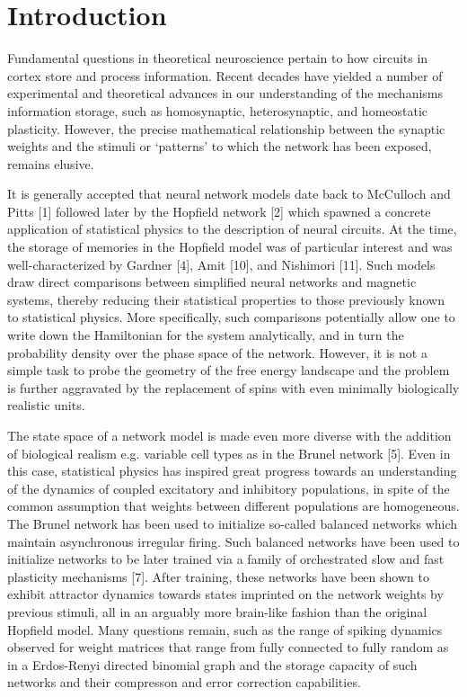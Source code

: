 \documentclass{ucetd}
\begin{document}
\mainmatter

\chapter{Introduction}

Fundamental questions in theoretical neuroscience pertain to how circuits in cortex store and process information. Recent decades have yielded a number of experimental and theoretical advances in our understanding of the mechanisms information storage, such as homosynaptic, heterosynaptic, and homeostatic plasticity. However, the precise mathematical relationship between the synaptic weights and the stimuli or `patterns' to which the network has been exposed, remains elusive. 

It is generally accepted that neural network models date back to McCulloch and Pitts [1] followed later by the Hopfield network [2] which spawned a concrete application of statistical physics to the description of neural circuits. At the time, the storage of memories in the Hopfield model was of particular interest and was well-characterized by Gardner [4], Amit [10], and Nishimori [11]. Such models draw direct comparisons between simplified neural networks and magnetic systems, thereby reducing their statistical properties to those previously known to statistical physics. More specifically, such comparisons potentially allow one to write down the Hamiltonian for the system analytically, and in turn the probability density over the phase space of the network. However, it is not a simple task to probe the geometry of the free energy landscape and the problem is further aggravated by the replacement of spins with even minimally biologically realistic units. 

The state space of a network model is made even more diverse with the addition of biological realism e.g. variable cell types as in the Brunel network [5]. Even in this case, statistical physics has inspired great progress towards an understanding of the dynamics of coupled excitatory and inhibitory populations, in spite of the common assumption that weights between different populations are homogeneous. The Brunel network has been used to initialize so-called balanced networks which maintain asynchronous irregular firing. Such balanced networks have been used to initialize networks to be later trained via a family of orchestrated slow and fast plasticity mechanisms [7]. After training, these networks have been shown to exhibit attractor dynamics towards states imprinted on the network weights by previous stimuli, all in an arguably more brain-like fashion than the original Hopfield model. Many questions remain, such as the range of spiking dynamics observed for weight matrices that range from fully connected to fully random as in a Erdos-Renyi directed binomial graph and the storage capacity of such networks and their compresson and error correction capabilities.
\end{document}
